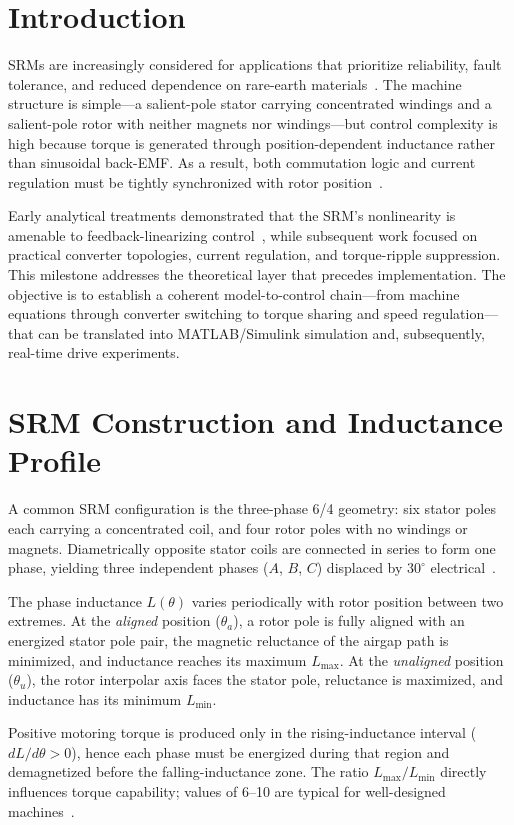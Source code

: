 \documentclass[conference]{IEEEtran}
\begin{document}
\section{Introduction}
SRMs are increasingly considered for applications that prioritize reliability, fault tolerance,
and reduced dependence on rare-earth materials~\cite{Miller1993,Krishnan2001}. The machine
structure is simple---a salient-pole stator carrying concentrated windings and a salient-pole
rotor with neither magnets nor windings---but control complexity is high because torque is
generated through position-dependent inductance rather than sinusoidal back-EMF. As a result,
both commutation logic and current regulation must be tightly synchronized with rotor
position~\cite{Husain1996}.

Early analytical treatments demonstrated that the SRM's nonlinearity is amenable to
feedback-linearizing control~\cite{Ilic1987}, while subsequent work focused on practical
converter topologies, current regulation, and torque-ripple suppression. This milestone
addresses the theoretical layer that precedes implementation. The objective is to establish a
coherent model-to-control chain---from machine equations through converter switching to torque
sharing and speed regulation---that can be translated into MATLAB/Simulink simulation and,
subsequently, real-time drive experiments.

\section{SRM Construction and Inductance Profile}
A common SRM configuration is the three-phase 6/4 geometry: six stator poles each carrying a
concentrated coil, and four rotor poles with no windings or magnets. Diametrically opposite
stator coils are connected in series to form one phase, yielding three independent phases
($A$, $B$, $C$) displaced by $30^{\circ}$ electrical~\cite{Miller1993}.

The phase inductance $L(\theta)$ varies periodically with rotor position between two extremes.
At the \emph{aligned} position ($\theta_a$), a rotor pole is fully aligned with an energized stator pole
pair, the magnetic reluctance of the airgap path is minimized, and inductance reaches its
maximum $L_{\max}$. At the \emph{unaligned} position ($\theta_u$), the rotor interpolar axis faces the
stator pole, reluctance is maximized, and inductance has its minimum $L_{\min}$.

Positive motoring torque is produced only in the rising-inductance interval ($dL/d\theta > 0$),
hence each phase must be energized during that region and demagnetized before the
falling-inductance zone. The ratio $L_{\max}/L_{\min}$ directly influences torque capability;
values of 6--10 are typical for well-designed machines~\cite{Krishnan2001}.
\end{document}
